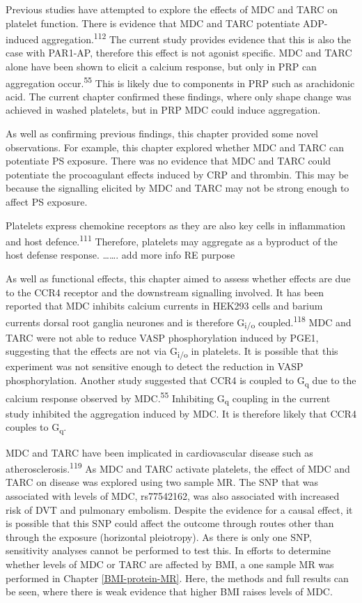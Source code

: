 \documentclass[11pt,twoside]{bristolthesis}
\begin{document}
Previous studies have attempted to explore the effects of MDC and TARC on platelet function. There is evidence that MDC and TARC potentiate ADP-induced aggregation.\textsuperscript{112} The current study provides evidence that this is also the case with PAR1-AP, therefore this effect is not agonist specific. MDC and TARC alone have been shown to elicit a calcium response, but only in PRP can aggregation occur.\textsuperscript{55} This is likely due to components in PRP such as arachidonic acid. The current chapter confirmed these findings, where only shape change was achieved in washed platelets, but in PRP MDC could induce aggregation.

As well as confirming previous findings, this chapter provided some novel observations. For example, this chapter explored whether MDC and TARC can potentiate PS exposure. There was no evidence that MDC and TARC could potentiate the procoagulant effects induced by CRP and thrombin. This may be because the signalling elicited by MDC and TARC may not be strong enough to affect PS exposure.

Platelets express chemokine receptors as they are also key cells in inflammation and host defence.\textsuperscript{111} Therefore, platelets may aggregate as a byproduct of the host defense response. \ldots\ldots. add more info RE purpose

As well as functional effects, this chapter aimed to assess whether effects are due to the CCR4 receptor and the downstream signalling involved. It has been reported that MDC inhibits calcium currents in HEK293 cells and barium currents dorsal root ganglia neurones and is therefore G\textsubscript{i/o} coupled.\textsuperscript{118} MDC and TARC were not able to reduce VASP phosphorylation induced by PGE1, suggesting that the effects are not via G\textsubscript{i/o} in platelets. It is possible that this experiment was not sensitive enough to detect the reduction in VASP phosphorylation. Another study suggested that CCR4 is coupled to G\textsubscript{q} due to the calcium response observed by MDC.\textsuperscript{55} Inhibiting G\textsubscript{q} coupling in the current study inhibited the aggregation induced by MDC. It is therefore likely that CCR4 couples to G\textsubscript{q}.

MDC and TARC have been implicated in cardiovascular disease such as atherosclerosis.\textsuperscript{119} As MDC and TARC activate platelets, the effect of MDC and TARC on disease was explored using two sample MR. The SNP that was associated with levels of MDC, rs77542162, was also associated with increased risk of DVT and pulmonary embolism. Despite the evidence for a causal effect, it is possible that this SNP could affect the outcome through routes other than through the exposure (horizontal pleiotropy). As there is only one SNP, sensitivity analyses cannot be performed to test this. In efforts to determine whether levels of MDC or TARC are affected by BMI, a one sample MR was performed in Chapter \ref{BMI-protein-MR}. Here, the methods and full results can be seen, where there is weak evidence that higher BMI raises levels of MDC.
\end{document}
